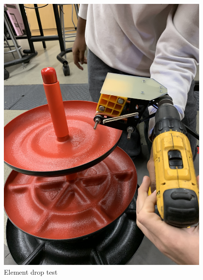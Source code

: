 \begin{figure}[ht]
\begin{minipage}[b]{.48\textwidth}
  \includegraphics[width=0.95\textwidth]{Meetings/December/12-30-21/12-30-21_Hardware_Figure6 - Nathan Forrer.JPG}
  \caption{Element drop test}
  \label{fig:123021_6}
\end{minipage}
\end{figure}




